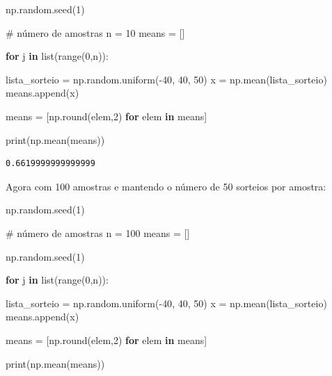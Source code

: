 \documentclass[
  brazilian,
  letterpaper,
  DIV=11,
  numbers=noendperiod]{scrreprt}
\newenvironment{Shaded}{\begin{snugshade}}{\end{snugshade}}
\newcommand{\BuiltInTok}[1]{\textcolor[rgb]{0.00,0.23,0.31}{#1}}
\newcommand{\CommentTok}[1]{\textcolor[rgb]{0.37,0.37,0.37}{#1}}
\newcommand{\ControlFlowTok}[1]{\textcolor[rgb]{0.00,0.23,0.31}{\textbf{#1}}}
\newcommand{\DecValTok}[1]{\textcolor[rgb]{0.68,0.00,0.00}{#1}}
\newcommand{\KeywordTok}[1]{\textcolor[rgb]{0.00,0.23,0.31}{\textbf{#1}}}
\newcommand{\NormalTok}[1]{\textcolor[rgb]{0.00,0.23,0.31}{#1}}
\newcommand{\OperatorTok}[1]{\textcolor[rgb]{0.37,0.37,0.37}{#1}}
\begin{document}
\begin{Shaded}
\begin{Highlighting}[]
\NormalTok{np.random.seed(}\DecValTok{1}\NormalTok{)}

\CommentTok{\# número de amostras}
\NormalTok{n }\OperatorTok{=} \DecValTok{10} 
\NormalTok{means }\OperatorTok{=}\NormalTok{ [] }

\ControlFlowTok{for}\NormalTok{ j }\KeywordTok{in} \BuiltInTok{list}\NormalTok{(}\BuiltInTok{range}\NormalTok{(}\DecValTok{0}\NormalTok{,n)):}
    
\NormalTok{    lista\_sorteio }\OperatorTok{=}\NormalTok{ np.random.uniform(}\OperatorTok{{-}}\DecValTok{40}\NormalTok{, }\DecValTok{40}\NormalTok{, }\DecValTok{50}\NormalTok{)}
\NormalTok{    x }\OperatorTok{=}\NormalTok{ np.mean(lista\_sorteio)}
\NormalTok{    means.append(x)}

\NormalTok{means }\OperatorTok{=}\NormalTok{ [np.}\BuiltInTok{round}\NormalTok{(elem,}\DecValTok{2}\NormalTok{) }\ControlFlowTok{for}\NormalTok{ elem }\KeywordTok{in}\NormalTok{ means]}

\BuiltInTok{print}\NormalTok{(np.mean(means))}
\end{Highlighting}
\end{Shaded}

\begin{verbatim}
0.6619999999999999
\end{verbatim}

Agora com 100 amostras e mantendo o número de 50 sorteios por amostra:

\begin{Shaded}
\begin{Highlighting}[]
\NormalTok{np.random.seed(}\DecValTok{1}\NormalTok{)}

\CommentTok{\# número de amostras}
\NormalTok{n }\OperatorTok{=} \DecValTok{100} 
\NormalTok{means }\OperatorTok{=}\NormalTok{ [] }

\NormalTok{np.random.seed(}\DecValTok{1}\NormalTok{)}

\ControlFlowTok{for}\NormalTok{ j }\KeywordTok{in} \BuiltInTok{list}\NormalTok{(}\BuiltInTok{range}\NormalTok{(}\DecValTok{0}\NormalTok{,n)):}
    
\NormalTok{    lista\_sorteio }\OperatorTok{=}\NormalTok{ np.random.uniform(}\OperatorTok{{-}}\DecValTok{40}\NormalTok{, }\DecValTok{40}\NormalTok{, }\DecValTok{50}\NormalTok{)}
\NormalTok{    x }\OperatorTok{=}\NormalTok{ np.mean(lista\_sorteio)}
\NormalTok{    means.append(x)}

\NormalTok{means }\OperatorTok{=}\NormalTok{ [np.}\BuiltInTok{round}\NormalTok{(elem,}\DecValTok{2}\NormalTok{) }\ControlFlowTok{for}\NormalTok{ elem }\KeywordTok{in}\NormalTok{ means]}

\BuiltInTok{print}\NormalTok{(np.mean(means))}
\end{Highlighting}
\end{Shaded}
\end{document}
